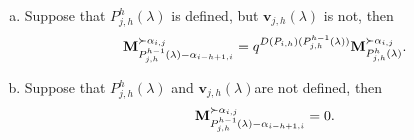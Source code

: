 \begin{lemma}
\begin{enumerate}[(a)]
\begin{equation}
    \end{equation}
        \item Suppose that $P^{h}_{j,h}(\lambda)$ is defined, but $\mathbf{v}_{j,h}(\lambda)$ is not, then\label{item V no existe}
    \begin{equation}\label{eq: ultimo P  y v no existe}
        \mathbf{M}_{P^{h-1}_{j,h}(\lambda) - \alpha_{i-h+1,i}}^{\succ \alpha_{i,j}} = q^{D(P_{i,h})(P_{j,h}^{h-1}(\lambda))} \mathbf{M}_{P^{h}_{j,h}(\lambda)}^{\succ \alpha_{i,j}}.
    \end{equation}
        \item Suppose that $P^{h}_{j,h}(\lambda)$ and $\mathbf{v}_{j,h}(\lambda)$are not defined, then\label{item p y v no existen}
    \begin{equation}\label{eq: ultimo P, ambos no existen}
        \mathbf{M}_{P^{h-1}_{j,h}(\lambda) - \alpha_{i-h+1,i}}^{\succ \alpha_{i,j}} = 0.
    \end{equation}
    \end{enumerate}
\end{lemma}

